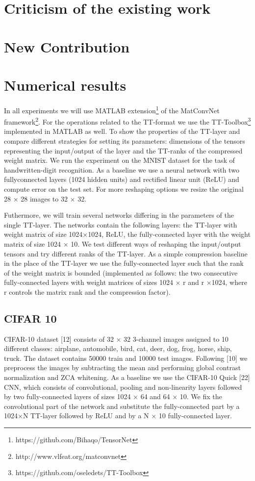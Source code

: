 \documentclass[onecolumn, conference]{IEEEtran}
\begin{document}
\section{Criticism of the existing work}

\section{New Contribution}


\section{Numerical results}
In all experiments we will use MATLAB extension\footnote{https://github.com/Bihaqo/TensorNet} of the MatConvNet framework\footnote{http://www.vlfeat.org/matconvnet}. For the operations related to the TT-format we use the TT-Toolbox\footnote{https://github.com/oseledets/TT-Toolbox} implemented in MATLAB as well.
To show the properties of the TT-layer and compare different strategies for setting its parameters: dimensions of the tensors representing the input/output of the layer and the TT-ranks of the compressed weight matrix. 
We run the experiment on the MNIST dataset for the task of handwritten-digit recognition. 
As a baseline we use a neural network with two fullyconnected layers (1024 hidden units) and rectiﬁed linear unit (ReLU) and compute error on the test set. 
For more reshaping options we resize the original 28 × 28 images to 32 × 32.

Futhermore, we will train several networks differing in the parameters of the single TT-layer. The networks contain the following layers: the TT-layer with weight matrix of size 1024×1024, ReLU, the fully-connected layer with the weight matrix of size 1024 × 10. 
We test different ways of reshaping the input/output tensors and try different ranks of the TT-layer. 
As a simple compression baseline in the place of the TT-layer we use the fully-connected layer such that the rank of the weight matrix is bounded (implemented as follows: the two consecutive fully-connected layers with weight matrices of sizes 1024 × r and r ×1024, where r controls the matrix rank and the compression factor). 

\subsection{CIFAR 10}
CIFAR-10 dataset [12] consists of 32 × 32 3-channel images assigned to 10 different classes: airplane, automobile, bird, cat, deer, dog, frog, horse, ship, truck. The dataset contains 50000 train and
10000 test images. Following [10] we preprocess the images by subtracting the mean and performing global contrast normalization and ZCA whitening.
As a baseline we use the CIFAR-10 Quick [22] CNN, which consists of convolutional, pooling and
non-linearity layers followed by two fully-connected layers of sizes 1024 × 64 and 64 × 10. We fix
the convolutional part of the network and substitute the fully-connected part by a 1024×N TT-layer followed by ReLU and by a N × 10 fully-connected layer. 
\end{document}
